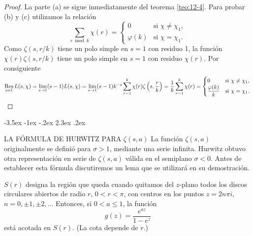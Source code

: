 \documentclass[12pt,a4paper]{book}
\makeatletter
\renewcommand\section{\@startsection{section}{1}{\z@}%
  {-3.5ex \@plus -1ex \@minus -.2ex}%
  {2.3ex \@plus .2ex}%
  {\normalfont\Large\bfseries\raggedright}}
\makeatother
\begin{document}
    \begin{proof}
        La parte (a) se sigue inmediatamente del teorema \ref{teo:12-4}. Para probar (b) y (c)
        utilizamos la relación
        \begin{equation*}
            \sum_{r\bmod k}\chi(r)=
            \begin{cases}
                0&\text{si }\chi\neq\chi_{1},\\
                \varphi(k)&\text{si }\chi=\chi_{1}.
            \end{cases}
        \end{equation*}
        Como $\zeta(s,r/k)$ tiene un polo simple en $s=1$ con residuo 1, la función
        $\chi(r)\zeta(s,r/k)$ tiene un polo simple en $s=1$ con residuo $\chi(r)$. Por
        consiguiente
        \begin{equation*}
            \operatorname*{Res}_{s=1}L(s,\chi)=\lim_{s\to1}(s-1)L(s,\chi)=\lim_{s\to1}(s-1)k^{-s}\sum_{r=1}^{k}\chi(r)\zeta\left(s,\frac{r}{k}\right)
            =\frac{1}{k}\sum_{r=1}^{k}\chi(r)=
            \begin{cases}
                0&\text{si }\chi\neq\chi_{1},\\
                \dfrac{\varphi(k)}{k}&\text{si }\chi=\chi_{1}.
            \end{cases}\qedhere
        \end{equation*}
    \end{proof}

    \section{LA FÓRMULA DE HURWITZ PARA \texorpdfstring{$\zeta(s,a)$}{ζ(s,a)}}
    La función $\zeta(s,a)$ originalmente se definió para $\sigma>1$, mediante una serie
    infinita. Hurwitz obtuvo otra representación en serie de $\zeta(s,a)$ válida en el
    semiplano $\sigma<0$. Antes de establecer esta fórmula discutiremos un lema que se
    utilizará en su demostración.

    \begin{lema}\label{lem:12-1}
        $S(r)$ designa la región que queda cuando quitamos del $z$-plano todos los discos
        circulares abiertos de radio $r$, $0<r<\pi$, con centros en los puntos $z=2n\pi i$,
        $n=0,\pm1,\pm2,\dots$ Entonces, si $0<a\leq1$, la función
        \begin{equation*}
            g(z)=\frac{e^{az}}{1-e^{z}}
        \end{equation*}
        está acotada en $S(r)$. (La cota depende de $r$.)
    \end{lema}
\end{document}
